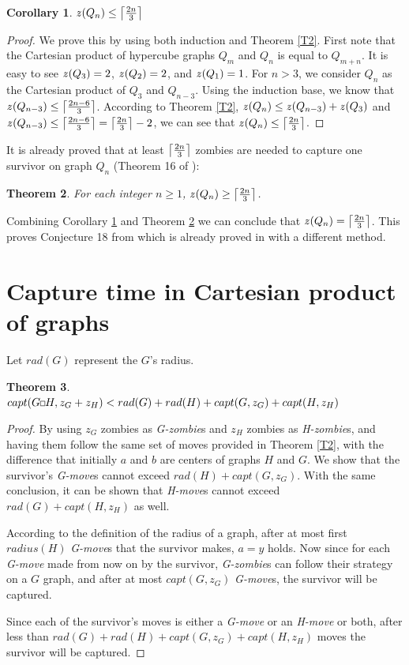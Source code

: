 \documentclass[1p]{elsarticle}
\DeclarePairedDelimiter\ceil{\lceil}{\rceil} \DeclarePairedDelimiter\floor{\lfloor}{\rfloor}
\newtheorem{theorem}{Theorem}
\newtheorem{corollary}[theorem]{Corollary}
\newcommand{\zn}{\ooalign{$z$\cr\hfil\rule[.5ex]{.2em}{.08ex}\hfil\cr}}
\newcommand{\sq}[1][black]{%
\begin{tikzpicture}                                                           
  \draw[#1] (2pt,0pt) -- (6pt,0pt);   
  \draw[#1] (2pt,0pt) -- (2pt,4pt);    
  \draw[#1] (2pt,4pt) -- (6pt,4pt);   
  \draw[#1] (6pt,0pt) -- (6pt,4pt);
\end{tikzpicture}%
}
\begin{document}
\begin{corollary}
	\label{C3}
	$\zn(Q_{n}) \leq \ceil*{\frac{2n}{3}}$
\end{corollary}
\begin{proof}
	We prove this by using both induction and Theorem \ref{T2}. First note that the Cartesian product of
	hypercube graphs $Q_{m}$ and $Q_{n}$ is equal to $Q_{m+n}$. It is easy to see $\zn(Q_3) = 2$, $\zn(Q_2) = 2$, and
	$\zn(Q_1) = 1$. For $n > 3$, we consider $Q_n$ as the Cartesian product of $Q_3$ and $Q_{n-3}$. Using the induction
	base, we know that $\zn(Q_{n-3}) \leq \ceil*{\frac{2n - 6}{3}}$. According to Theorem \ref{T2}, $\zn(Q_n) \leq
	\zn(Q_{n-3}) + \zn(Q_3)$ and $\zn(Q_{n-3}) \leq \ceil*{\frac{2n - 6}{3}} = \ceil*{\frac{2n}{3}} - 2$, we can see that
	$\zn(Q_n) \leq \ceil*{\frac{2n}{3}}$.
\end{proof}

It is already proved that at least $\ceil*{\frac{2n}{3}}$ zombies are needed to capture one survivor on graph $Q_n$
(Theorem 16 of \cite{Fitz16}):

\begin{theorem}
	\label{T4}
	For each integer $n \geq 1$, $\zn(Q_n) \geq \ceil*{\frac{2n}{3}} $.
\end{theorem}

Combining Corollary \ref{C3} and Theorem \ref{T4} we can conclude that $\zn(Q_n) = \ceil*{\frac{2n}{3}}$.
This proves Conjecture 18 from \cite{Fitz16} which is already proved in \cite{Offner19} with a different method. 
	

\section{Capture time in Cartesian product of graphs}\label{capturetime}
	
	Let $rad(G)$ represent the $G$'s radius.
	\begin{theorem}
		\label{T5}
		$capt( G \sq H, z_G + z_H ) < rad(G) + rad(H) + capt(G, z_G) + capt(H, z_H)$
	\end{theorem}
	\begin{proof}
		By using $z_G$ zombies as {\it G-zombie}s and $z_H$ zombies as {\it H-zombie}s, and having them follow the same
		set of moves provided in Theorem \ref{T2}, with the difference that initially $a$ and $b$ are centers of graphs
		$H$ and $G$. We show that the survivor's {\it G-move}s cannot exceed $rad(H) + capt(G, z_G)$. With the same
		conclusion, it can be shown that {\it H-move}s cannot exceed $rad(G) + capt(H, z_H)$ as well.

		According to the definition of the radius of a graph, after at most first $radius(H)$ {\it G-move}s that the
		survivor makes, $a = y$ holds. Now since for each {\it G-move} made from now on by the survivor, {\it G-zombie}s
		can follow their strategy on a $G$ graph, and after at most $capt(G,z_G)$ {\it G-move}s, the survivor will be
		captured. 
		
		Since each of the survivor's moves is either a {\it G-move} or an {\it H-move} or both, after less than $rad(G)
		+ rad(H) + capt(G, z_G) + capt(H, z_H)$ moves the survivor will be captured.
	\end{proof}
\end{document}
